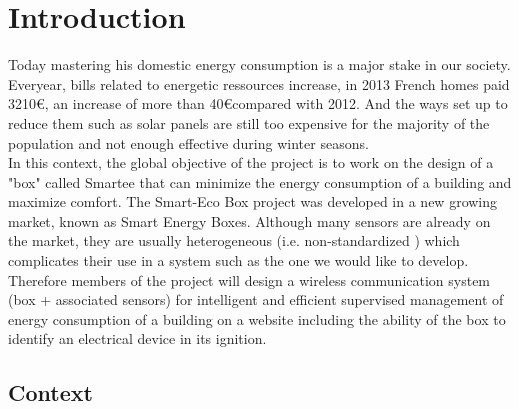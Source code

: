 %
%
\section{Introduction}

Today mastering his domestic energy consumption is a major stake in our society. Everyear, bills related to energetic ressources increase, in 2013 French homes paid 3210\euro, an increase of more than 40\euro compared with 2012. And the ways set up to reduce them such as solar panels are still too expensive for the majority of the population and not enough effective during winter seasons.\\


In this context, the global objective of the project is to work on the design of a "box" called Smartee that can minimize the energy consumption of a building and maximize comfort. The Smart-Eco Box project was developed in a new growing market, known as Smart Energy Boxes. Although many sensors are already on the market, they are usually heterogeneous (i.e. non-standardized ) which complicates their use in a system such as the one we would like to develop. Therefore members of the project will design a wireless communication system (box + associated sensors) for intelligent and efficient supervised management of energy consumption of a building on a website including the ability of the box to identify an electrical device in its ignition.\\

\subsection{Context}

